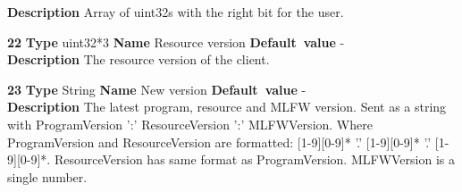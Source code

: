 \begin{list}{\textbf{ParamID}}{}
  \label{Rights bitfield}
  \textbf{Description} Array of uint32s with the right bit for the user.
\item \textbf{22} \textbf{Type} uint32*3 \textbf{Name} Resource version
                 \textbf{Default~value} - \\
  \label{Resource version}
  \textbf{Description} The resource version of the client.
\item \textbf{23} \textbf{Type} String \textbf{Name} New version
                 \textbf{Default~value} - \\
  \label{New version}
  \textbf{Description} The latest program, resource and MLFW version.
                       Sent as a string with  
                       ProgramVersion ':' ResourceVersion ':' MLFWVersion. 
                       Where
                       ProgramVersion and ResourceVersion are formatted:
                       [1-9][0-9]* '.' [1-9][0-9]* '.' [1-9][0-9]*.
                       ResourceVersion has same format as ProgramVersion.
                       MLFWVersion is a single number.


\end{list}
